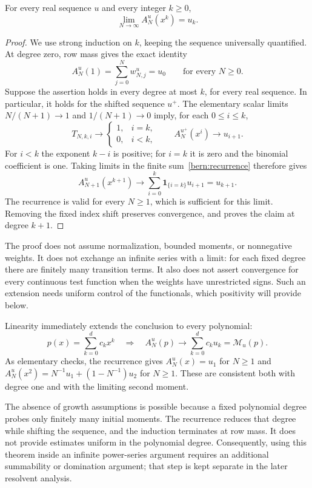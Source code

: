 \begin{theorem}\label{bern:moment-limit}
For every real sequence $u$ and every integer $k\ge0$,
\begin{equation}\label{bern:limit}
 \lim_{N\to\infty}A_N^u(x^k)=u_k.
\end{equation}
\end{theorem}
\begin{proof}
We use strong induction on $k$, keeping the sequence universally
quantified. At degree zero, row mass gives the exact identity
\[
 A_N^u(1)=\sum_{j=0}^Nw^u_{N,j}=u_0
 \qquad\text{for every }N\ge0.
\]
Suppose the assertion holds in every degree at most $k$, for every
real sequence. In particular, it holds for the shifted sequence
$u^+$. The elementary scalar limits $N/(N+1)\to1$ and
$1/(N+1)\to0$ imply, for each $0\le i\le k$,
\[
 T_{N,k,i}\longrightarrow
 \begin{cases}1,&i=k,\\0,&i<k,\end{cases}
 \qquad A_N^{u^+}(x^i)\longrightarrow u_{i+1}.
\]
For $i<k$ the exponent $k-i$ is positive; for $i=k$ it is zero
and the binomial coefficient is one. Taking limits in the finite
sum~\eqref{bern:recurrence} therefore gives
\[
 A_{N+1}^u(x^{k+1})\longrightarrow
       \sum_{i=0}^k\mathbf1_{\{i=k\}}u_{i+1}=u_{k+1}.
\]
The recurrence is valid for every $N\ge1$, which is sufficient for
this limit. Removing the fixed index shift preserves convergence,
and proves the claim at degree $k+1$.
\end{proof}

The proof does not assume normalization, bounded moments, or
nonnegative weights. It does not exchange an infinite series with
a limit: for each fixed degree there are finitely many transition
terms. It also does not assert convergence for every continuous
test function when the weights have unrestricted signs. Such an
extension needs uniform control of the functionals, which positivity
will provide below.

Linearity immediately extends the conclusion to every polynomial:
\[
 p(x)=\sum_{k=0}^dc_kx^k
 \quad\Longrightarrow\quad
 A_N^u(p)\longrightarrow\sum_{k=0}^dc_ku_k=\mathcal M_u(p).
\]
As elementary checks, the recurrence gives
$A_N^u(x)=u_1$ for $N\ge1$ and
$A_N^u(x^2)=N^{-1}u_1+(1-N^{-1})u_2$ for $N\ge1$.
These are consistent both with degree one and with the limiting
second moment.

The absence of growth assumptions is possible because a fixed
polynomial degree probes only finitely many initial moments. The
recurrence reduces that degree while shifting the sequence, and the
induction terminates at row mass. It does not provide estimates
uniform in the polynomial degree. Consequently, using this theorem
inside an infinite power-series argument requires an additional
summability or domination argument; that step is kept separate in
the later resolvent analysis.

